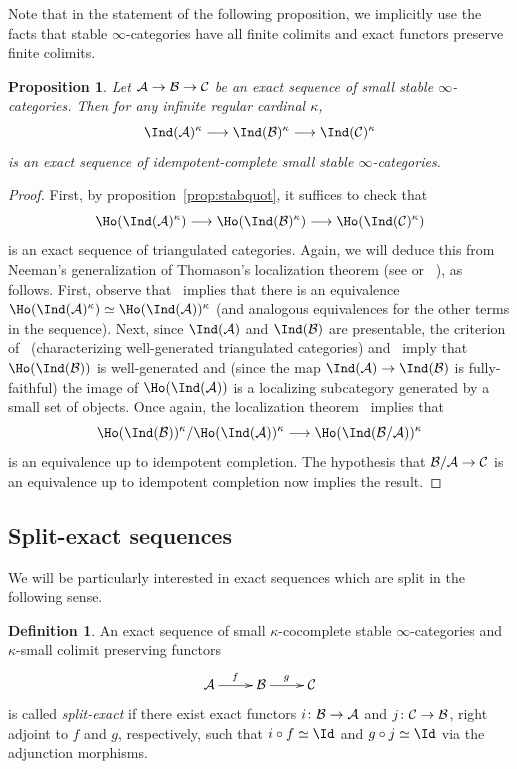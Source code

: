 \documentclass{amsart}
\newcommand{\htp}{\simeq}
\renewcommand{\to}{\mathchoice{\longrightarrow}{\rightarrow}{\rightarrow}{\rightarrow}}
\let\catsymbfont\mathcal
\newcommand{\aA}{{\catsymbfont{A}}}
\newcommand{\aB}{{\catsymbfont{B}}}
\newcommand{\aC}{{\catsymbfont{C}}}
\renewcommand{\i}{\infty}
\numberwithin{equation}{section}
\newtheorem{proposition}[equation]{Proposition}
\theoremstyle{definition}
\newtheorem{definition}[equation]{Definition}
\begin{document}
Note that in the statement of the following proposition, we implicitly
use the facts that stable $\i$-categories have all finite colimits and
exact functors preserve finite colimits.

\begin{proposition}\label{prop:notyet}
Let $\aA\to\aB\to\aC$ be an exact sequence of small stable
$\i$-categories.  Then for any infinite regular cardinal $\kappa$,
\[
\Ind(\aA)^\kappa\to\Ind(\aB)^\kappa\to\Ind(\aC)^\kappa
\]
is an exact sequence of idempotent-complete small stable
$\i$-categories.
\end{proposition}

\begin{proof}
First, by proposition~\ref{prop:stabquot}, it suffices to check that
\[ 
\Ho(\Ind(\aA)^\kappa) \to\Ho(\Ind(\aB)^\kappa)\to\Ho(\Ind(\aC)^\kappa)
\]
is an exact sequence of triangulated categories.  Again, we will
deduce this from Neeman's generalization of Thomason's localization
theorem  (see \cite[4.4.9]{Neeman} or ~\cite{NeemanLoc}), as follows.
First, observe that~\cite[1.4.5.1]{HAG} implies that there is an 
equivalence $\Ho(\Ind(\aA)^{\kappa}) \htp \Ho(\Ind(\aA))^{\kappa}$
(and analogous equivalences for the other terms in the sequence).
Next, since $\Ind(\aA)$ and $\Ind(\aB)$ are
presentable, the criterion of~\cite{Krausewell} (characterizing
well-generated triangulated categories) and~\cite[1.4.5.2]{HAG} imply
that $\Ho(\Ind(\aB))$ is well-generated and (since the map
$\Ind(\aA) \to \Ind(\aB)$ is fully-faithful) the image of
$\Ho(\Ind(\aA))$ is a localizing subcategory generated by a small set  
of objects.  Once again, the localization
theorem~\cite[7.2.1]{Krausenotes} implies that  
\[
\Ho(\Ind(\aB))^\kappa/\Ho(\Ind(\aA))^\kappa\to\Ho(\Ind(\aB/\aA))^\kappa
\]
is an equivalence up to idempotent completion.  The hypothesis that
$\aB/\aA \to \aC$ is an equivalence up to idempotent completion now
implies the result.
\end{proof}

\subsection{Split-exact sequences}
We will be particularly interested in exact sequences which are split in
the following sense.

\begin{definition}\label{def:splitexact}
An exact sequence of small $\kappa$-cocomplete stable $\i$-categories
and $\kappa$-small colimit preserving functors 
\[
\xymatrix{
\aA \ar[r]^{f} & \aB \ar[r]^{g} & \aC \\
}
\]
is called {\it split-exact} if there exist exact functors $i \colon \aB \to \aA$
and $j \colon \aC \to \aB$, right adjoint to $f$ and $g$, respectively,
such that $i \circ f \htp \Id$ and $g \circ j \htp \Id$ via the
adjunction morphisms.
\end{definition}
\end{document}

